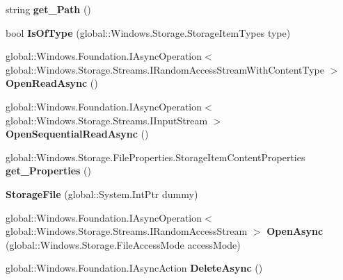 \begin{DoxyCompactItemize}
string {\bfseries get\+\_\+\+Path} ()
\item 
\mbox{\label{class_windows_1_1_storage_1_1_storage_file_aab7da0a2a5ea0ef0219616c0ebbf92e7}} 
bool {\bfseries Is\+Of\+Type} (global\+::\+Windows.\+Storage.\+Storage\+Item\+Types type)
\item 
\mbox{\label{class_windows_1_1_storage_1_1_storage_file_a35c626039408667e2520e113fb58342d}} 
global\+::\+Windows.\+Foundation.\+I\+Async\+Operation$<$ global\+::\+Windows.\+Storage.\+Streams.\+I\+Random\+Access\+Stream\+With\+Content\+Type $>$ {\bfseries Open\+Read\+Async} ()
\item 
\mbox{\label{class_windows_1_1_storage_1_1_storage_file_adc6fa1909202e33273e037fa3347c319}} 
global\+::\+Windows.\+Foundation.\+I\+Async\+Operation$<$ global\+::\+Windows.\+Storage.\+Streams.\+I\+Input\+Stream $>$ {\bfseries Open\+Sequential\+Read\+Async} ()
\item 
\mbox{\label{class_windows_1_1_storage_1_1_storage_file_a9a59e8a2f5bd44c25773662197b786bd}} 
global\+::\+Windows.\+Storage.\+File\+Properties.\+Storage\+Item\+Content\+Properties {\bfseries get\+\_\+\+Properties} ()
\item 
\mbox{\label{class_windows_1_1_storage_1_1_storage_file_a5c85dbe0011a81cc6ef4b8d88c05567e}} 
{\bfseries Storage\+File} (global\+::\+System.\+Int\+Ptr dummy)
\item 
\mbox{\label{class_windows_1_1_storage_1_1_storage_file_a29ee2f060ba92e79eabded8b48966776}} 
global\+::\+Windows.\+Foundation.\+I\+Async\+Operation$<$ global\+::\+Windows.\+Storage.\+Streams.\+I\+Random\+Access\+Stream $>$ {\bfseries Open\+Async} (global\+::\+Windows.\+Storage.\+File\+Access\+Mode access\+Mode)
\item 
\mbox{\label{class_windows_1_1_storage_1_1_storage_file_a6d0d928c1dc9abd71b250099c2de27f1}} 
global\+::\+Windows.\+Foundation.\+I\+Async\+Action {\bfseries Delete\+Async} ()
\item 

\end{DoxyCompactItemize}
